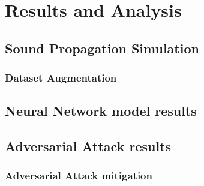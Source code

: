 \chapter{Results and Analysis}
\label{ch:results}

\section{Sound Propagation Simulation}

\subsection{Dataset Augmentation}

\section{Neural Network model results}

\section{Adversarial Attack results}

\subsection{Adversarial Attack mitigation}